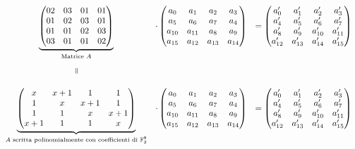 \[
\begin{array}{ccc}
\underbrace{
\begin{pmatrix}
02 & 03 & 01 & 01 \\
01 & 02 & 03 & 01 \\
01 & 01 & 02 & 03 \\
03 & 01 & 01 & 02
\end{pmatrix}
}_{\text{Matrice } A}
& 
\cdot
\begin{pmatrix}
a_0  & a_1  & a_2  & a_3  \\
a_5  & a_6  & a_7  & a_4  \\
a_{10} & a_{11} & a_8  & a_9  \\
a_{15} & a_{12} & a_{13} & a_{14}
\end{pmatrix}
&
=
\begin{pmatrix}
a'_0  & a'_1  & a'_2  & a'_3  \\
a'_4  & a'_5  & a'_6  & a'_7  \\
a'_8  & a'_9  & a'_{10} & a'_{11} \\
a'_{12} & a'_{13} & a'_{14} & a'_{15}
\end{pmatrix}
\\[4em]
{\rotatebox[origin=c]{-90}{$=$}} & & \\[1.5em]
\underbrace{
\begin{pmatrix}
x & x + 1 & 1 & 1 \\
1 & x & x + 1 & 1 \\
1 & 1 & x & x + 1 \\
x + 1 & 1 & 1 & x
\end{pmatrix}
}_{\text{$A$ scritta polinomialmente con coefficienti di $\mathbb{F}_2^8$}}
&
\cdot
\begin{pmatrix}
a_0  & a_1  & a_2  & a_3  \\
a_5  & a_6  & a_7  & a_4  \\
a_{10} & a_{11} & a_8  & a_9  \\
a_{15} & a_{12} & a_{13} & a_{14}
\end{pmatrix}
&
=
\begin{pmatrix}
a'_0  & a'_1  & a'_2  & a'_3  \\
a'_4  & a'_5  & a'_6  & a'_7  \\
a'_8  & a'_9  & a'_{10} & a'_{11} \\
a'_{12} & a'_{13} & a'_{14} & a'_{15}
\end{pmatrix}
\end{array}
\]